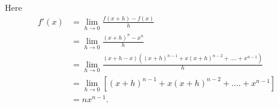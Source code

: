 \begin{solution}
    Here
    \begin{align*}
        f'(x)&=
        \lim_{h\to 0}{\frac
        {f(x+h)-f(x)}{h}}\\
        &=\lim_{h\to 0}{\frac
        {(x+h)^n-x^n}{h}}\\
        &=\lim_{h\to 0}{\frac
        {(x+h-x)((x+h)^{n-1}
        +x(x+h)^{n-2}+....+
        x^{n-1})}{h}}\\
        &=\lim_{h\to 0}
        {\left[(x+h)^{n-1}
        +x(x+h)^{n-2}+....+
        x^{n-1}\right]}\\
        &=nx^{n-1}.
    \end{align*}
\end{solution}